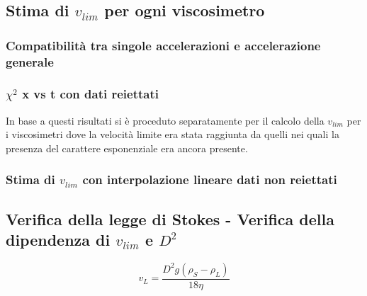 \documentclass[a4paper,11pt,oneside]{article}
\begin{document}
\subsection{Stima di $v_{lim}$ per ogni viscosimetro}

\subsubsection*{Compatibilità tra singole accelerazioni e accelerazione generale}

\subsubsection*{$\chi^2$  x vs t con dati reiettati}



In base a questi risultati si è proceduto separatamente per il calcolo della $v_{lim}$ per i viscosimetri dove la velocità limite era stata raggiunta da quelli nei quali la presenza del carattere esponenziale era ancora presente.

\subsubsection*{Stima di $v_{lim}$ con interpolazione lineare dati non reiettati}



\subsection{Verifica della legge di Stokes - Verifica della dipendenza di $v_{lim}$ e $D^2$}

\begin{equation*}
    v_{L}= \frac{{D}^2g\left(\rho_S - \rho_L\right)}{18 \eta }
\end{equation*}
\end{document}
